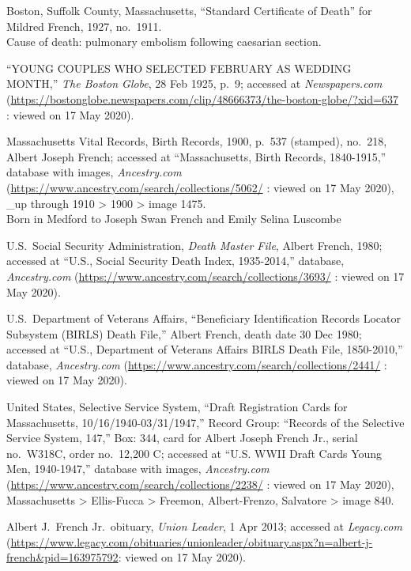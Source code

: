\begin{thebibliography}{999}
	Boston, Suffolk County, Massachusetts, ``Standard Certificate of Death'' for Mildred French, 1927, no.\ 1911.\\
	Cause of death: pulmonary embolism following caesarian section.
	
	``YOUNG COUPLES WHO SELECTED FEBRUARY AS WEDDING MONTH,'' \textit{The Boston Globe}, 28 Feb 1925, p.\ 9; accessed at \textit{Newspapers.com} (\url{https://bostonglobe.newspapers.com/clip/48666373/the-boston-globe/?xid=637} : viewed on 17 May 2020).
	
	Massachusetts Vital Records, Birth Records, 1900, p.\ 537 (stamped), no.\ 218, Albert Joseph French; accessed at ``Massachusetts, Birth Records, 1840-1915,'' database with images, \textit{Ancestry.com} (\url{https://www.ancestry.com/search/collections/5062/} : viewed on 17 May 2020), \_up through 1910 > 1900 > image 1475.\\
	Born in Medford to Joseph Swan French and Emily Selina Luscombe
	
	U.S.\ Social Security Administration, \textit{Death Master File}, Albert French, 1980; accessed at ``U.S., Social Security Death Index, 1935-2014,'' database, \textit{Ancestry.com} (\url{https://www.ancestry.com/search/collections/3693/} : viewed on 17 May 2020).
	
	U.S.\ Department of Veterans Affairs, ``Beneficiary Identification Records Locator Subsystem (BIRLS) Death File,'' Albert French, death date 30 Dec 1980; accessed at ``U.S., Department of Veterans Affairs BIRLS Death File, 1850-2010,'' database, \textit{Ancestry.com} (\url{https://www.ancestry.com/search/collections/2441/} : viewed on 17 May 2020).
	
	United States, Selective Service System, ``Draft Registration Cards for Massachusetts, 10/16/1940-03/31/1947,'' Record Group: ``Records of the Selective Service System, 147,'' Box: 344, card for Albert Joseph French Jr., serial no.\ W318C, order no.\ 12,200 C; accessed at ``U.S. WWII Draft Cards Young Men, 1940-1947,'' database with images, \textit{Ancestry.com} (\url{https://www.ancestry.com/search/collections/2238/} : viewed on 17 May 2020), Massachusetts > Ellis-Fucca > Freemon, Albert-Frenzo, Salvatore > image 840.
	
	Albert J.\ French Jr.\ obituary, \textit{Union Leader}, 1 Apr 2013; accessed at \textit{Legacy.com} (\url{https://www.legacy.com/obituaries/unionleader/obituary.aspx?n=albert-j-french\&pid=163975792}: viewed on 17 May 2020).
	

\end{thebibliography}
